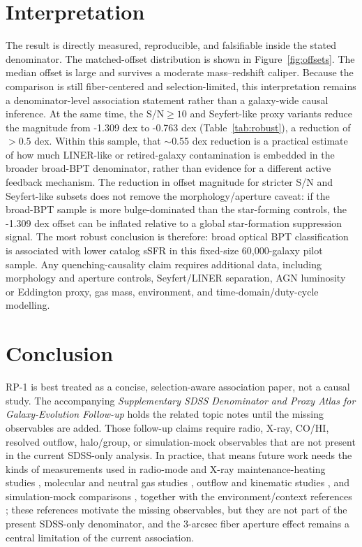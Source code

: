 \documentclass[twocolumn]{aastex631}
\begin{document}
\section{Interpretation}
The result is directly measured, reproducible, and falsifiable inside the stated denominator. The matched-offset distribution is shown in Figure~\ref{fig:offsets}. The median offset is large and survives a moderate mass--redshift caliper.
Because the comparison is still fiber-centered and selection-limited, this interpretation remains a denominator-level association statement rather than a galaxy-wide causal inference. At the same time, the S/N$\geq10$ and Seyfert-like proxy variants reduce the magnitude from -1.309 dex to -0.763 dex (Table~\ref{tab:robust}), a reduction of $>0.5$ dex. Within this sample, that $\sim$0.55 dex reduction is a practical estimate of how much LINER-like or retired-galaxy contamination is embedded in the broader broad-BPT denominator, rather than evidence for a different active feedback mechanism. The reduction in offset magnitude for stricter S/N and Seyfert-like subsets does not remove the morphology/aperture caveat: if the broad-BPT sample is more bulge-dominated than the star-forming controls, the -1.309 dex offset can be inflated relative to a global star-formation suppression signal. The most robust conclusion is therefore: broad optical BPT classification is associated with lower catalog sSFR in this fixed-size 60,000-galaxy pilot sample. Any quenching-causality claim requires additional data, including morphology and aperture controls, Seyfert/LINER separation, AGN luminosity or Eddington proxy, gas mass, environment, and time-domain/duty-cycle modelling.

\section{Conclusion}
RP-1 is best treated as a concise, selection-aware association paper, not a causal study. The accompanying \emph{Supplementary SDSS Denominator and Proxy Atlas for Galaxy-Evolution Follow-up} holds the related topic notes until the missing observables are added. Those follow-up claims require radio, X-ray, CO/HI, resolved outflow, halo/group, or simulation-mock observables that are not present in the current SDSS-only analysis.
In practice, that means future work needs the kinds of measurements used in radio-mode and X-ray maintenance-heating studies \citep{best2005,fabian2012,mcnamara2007,heckmanbest2014,lamassa2013}, molecular and neutral gas studies \citep{xcoldgass2017,xgass2018}, outflow and kinematic studies \citep{veilleux2005,cicone2014,carniani2017,fiore2017}, and simulation-mock comparisons \citep{simba2019,tng2019,eagle2015}, together with the environment/context references \citep{peng2010,piotrowska2022,wetzel2013,dekel2006}; these references motivate the missing observables, but they are not part of the present SDSS-only denominator, and the 3-arcsec fiber aperture effect remains a central limitation of the current association.
\end{document}

